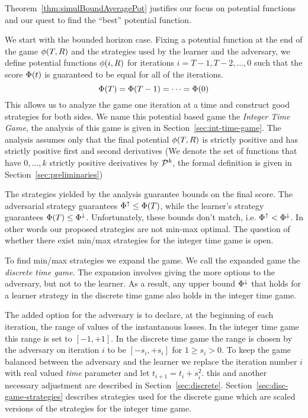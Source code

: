 \documentclass{article}[12pt]
\begin{document}
Theorem~\ref{thm:simulBoundAveragePot} justifies our focus on
potential functions and our quest to find the ``best'' potential
function. 

We start with the bounded horizon case. Fixing a potential function at
the end of the game $\phi(T,R)$ and the strategies used by the
learner and the adversary, we define potential functions $\phi(i,R)$
for iterations $i = T-1,T-2,\ldots,0$ such that the score $\Phi(t)$ is guaranteed to 
be equal for all of the iterations.
\[
  \Phi(T) = \Phi(T-1)=\cdots=\Phi(0)
\]
This allows us to analyze the game one iteration at a time and
construct good strategies for both sides. We name this potential based
game the {\em Integer Time Game}, the analysis of this game is given
in Section~\ref{sec:int-time-game}. The analysis assumes only that the
final potential $\phi(T,R)$ is strictly positive and has strictly positive
first and second derivatives (We denote the set
of functions that have $0,\ldots,k$ strictly positive derivatives by ${\cal P}^{k}$,
the formal definition is given in Section~\ref{sec:preliminaries})

The strategies yielded by the analysis guarantee bounds on the final
score. The adversarial strategy guarantees
$\Phi_{}^{\uparrow} \leq \Phi(T)$, while the learner's strategy
guarantees $\Phi(T) \leq \Phi_{}^{\downarrow}$. Unfortunately, these bounds
don't match, i.e. $\Phi_{}^{\uparrow}<\Phi_{}^{\downarrow}$. In other words our
proposed strategies are not min-max optimal. The question of whether
there exist min/max strategies for the integer time game is open.

To find min/max strategies we expand the game. We call the expanded
game the {\em discrete time game}. The expansion involves giving the
more options to the adversary, but not to the learner. As a result,
any upper bound $\Phi_{}^{\downarrow}$ that holds for a learner strategy in
the discrete time game also holds in the integer time game.

The added option for the adversary is to declare, at the beginning of
each iteration, the range of values of the instantanous losses. In the
integer time game this range is set to $[-1,+1]$. In the discrete time
game the range is chosen by the adversary on iteration $i$ to be
$[-s_i,+s_i]$ for $1\geq s_i >0$. To keep the game balanced between
the adversary and the learner we replace the iteration number $i$ with
real valued {\em time} parameter and let $t_{i+1}=t_i+s_i^2$. this and
another necessary adjustment are described in
Section~\ref{sec:discrete}. Section~\ref{sec:disc-game-strategies}
describes strategies used for the discrete game which are scaled
versions of the strategies for the integer time game.
\end{document}
